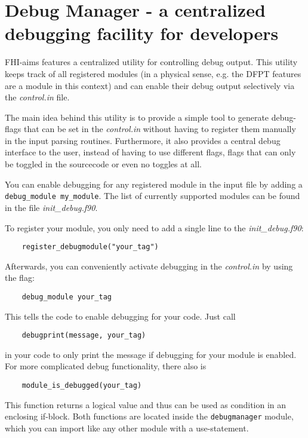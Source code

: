 \chapter[Debug Manager]{Debug Manager - a centralized debugging facility for developers}
\label{appendix_debugmanager}

FHI-aims features a centralized utility for controlling debug output. This utility keeps track of all registered
modules (in a physical sense, e.g. the DFPT features are a module in this context) and can enable their debug output
selectively via the \emph{control.in} file.

The main idea behind this utility is to provide a simple tool to generate debug-flags that can be set in the
\emph{control.in} without having to register them manually in the input parsing routines. Furthermore, it also
provides a central debug interface to the user, instead of having to use different flags, flags that can
only be toggled in the sourcecode or even no toggles at all.

You can enable debugging for any registered module in the input file by adding a \texttt{debug\_module my\_module}.
The list of currently supported modules can be found in the file \emph{init\_debug.f90}.

To register your module, you only need to add a single line to the \emph{init\_debug.f90}:
\begin{verbatim}
    register_debugmodule("your_tag")
\end{verbatim}
Afterwards, you can conveniently activate debugging in the \emph{control.in} by using the flag:
\begin{verbatim}
    debug_module your_tag
\end{verbatim}
This tells the code to enable debugging for your code. Just call
\begin{verbatim}
    debugprint(message, your_tag)
\end{verbatim}
in your code to only print the message if debugging for your module is enabled. For more complicated debug
functionality, there also is
\begin{verbatim}
    module_is_debugged(your_tag)
\end{verbatim}
This function returns a logical value and thus can be used as condition in an enclosing if-block. Both functions are
located inside the \texttt{debugmanager} module, which you can import like any other module with a use-statement.